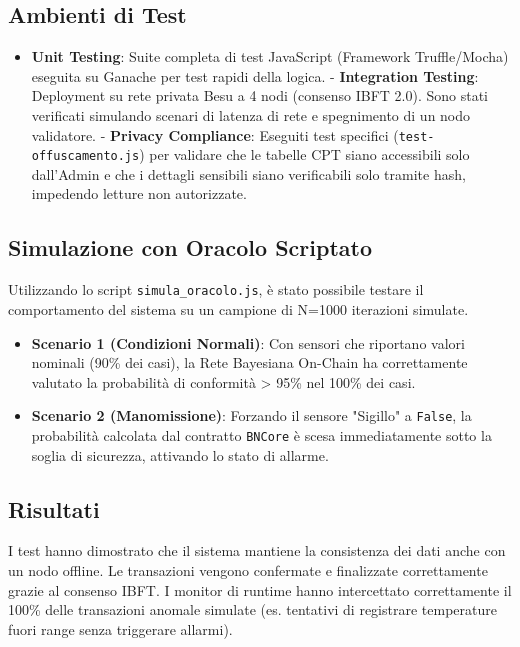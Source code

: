 \subsection{Ambienti di Test}
\begin{itemize}
    \item \textbf{Unit Testing}: Suite completa di test JavaScript (Framework Truffle/Mocha) eseguita su Ganache per test rapidi della logica.
    - \textbf{Integration Testing}: Deployment su rete privata Besu a 4 nodi (consenso IBFT 2.0). Sono stati verificati simulando scenari di latenza di rete e spegnimento di un nodo validatore.
    - \textbf{Privacy Compliance}: Eseguiti test specifici (\texttt{test-offuscamento.js}) per validare che le tabelle CPT siano accessibili solo dall'Admin e che i dettagli sensibili siano verificabili solo tramite hash, impedendo letture non autorizzate.
\end{itemize}

\subsection{Simulazione con Oracolo Scriptato}
Utilizzando lo script \texttt{simula\_oracolo.js}, è stato possibile testare il comportamento del sistema su un campione di N=1000 iterazioni simulate.
\begin{itemize}
    \item \textbf{Scenario 1 (Condizioni Normali)}: Con sensori che riportano valori nominali (90\% dei casi), la Rete Bayesiana On-Chain ha correttamente valutato la probabilità di conformità > 95\% nel 100\% dei casi.
    \item \textbf{Scenario 2 (Manomissione)}: Forzando il sensore "Sigillo" a \texttt{False}, la probabilità calcolata dal contratto \texttt{BNCore} è scesa immediatamente sotto la soglia di sicurezza, attivando lo stato di allarme.
\end{itemize}

\subsection{Risultati}
I test hanno dimostrato che il sistema mantiene la consistenza dei dati anche con un nodo offline. Le transazioni vengono confermate e finalizzate correttamente grazie al consenso IBFT. I monitor di runtime hanno intercettato correttamente il 100\% delle transazioni anomale simulate (es. tentativi di registrare temperature fuori range senza triggerare allarmi).
